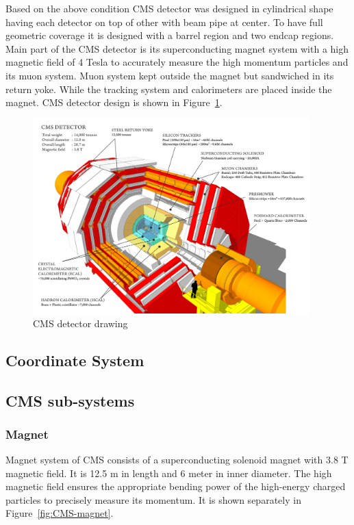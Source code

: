 Based on the above condition CMS detector was designed in cylindrical shape having each detector on top of other with beam pipe at center. To have full geometric coverage it is designed with a barrel region and two endcap regions. Main part of the CMS detector is its superconducting magnet system with a high magnetic field of 4 Tesla to accurately measure the high momentum particles and its muon system. Muon system kept outside the magnet but sandwiched in its return yoke. While the tracking system and calorimeters are placed inside the magnet. CMS detector design is shown in Figure~\ref{fig:CMS-detector}.
\begin{figure}[!htbp]
	\centering
	\includegraphics[width=0.95\textwidth]{figures/LHC/cms_120918_03.png}
	\caption{CMS detector drawing}
	\label{fig:CMS-detector}
\end{figure}

\subsection{Coordinate System} %
\label{sub:coordinate_system}

\subsection{CMS sub-systems} %
\label{sub:cms_sub_systems}

\subsubsection{Magnet} %
\label{ssub:magnet}
Magnet system of CMS consists of a superconducting solenoid magnet with 3.8 T magnetic field. It is 12.5 m in length and 6 meter in inner diameter. The high magnetic field ensures the appropriate bending power of the high-energy charged particles to precisely measure its momentum. It is shown separately in Figure~\ref{fig:CMS-magnet}.

